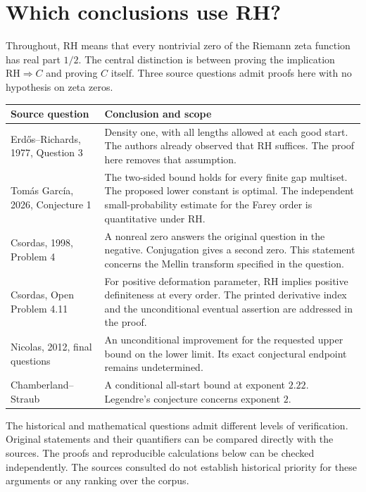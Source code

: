 \documentclass[11pt,a4paper]{article}
\begin{document}
\section{Which conclusions use RH?}
Throughout, RH means that every nontrivial zero of the Riemann zeta function
has real part $1/2$. The central distinction is between proving the
implication $\mathrm{RH}\Rightarrow C$ and proving $C$ itself.
Three source questions admit proofs here with no hypothesis on zeta zeros.
\begin{center}
\small\renewcommand{\arraystretch}{1.24}
\begin{tabularx}{\linewidth}{@{}p{.26\linewidth}X@{}}
\toprule
Source question & Conclusion and scope\\
\midrule
Erd\H{o}s--Richards, 1977, Question 3 \cite{er} &
Density one, with all lengths allowed at each good start. The authors
already observed that RH suffices. The proof here removes that assumption.\\
Tom\'as Garc\'ia, 2026, Conjecture 1 \cite{tg} &
The two-sided bound holds for every finite gap multiset. The proposed
lower constant is optimal. The independent small-probability estimate
for the Farey order is quantitative under RH.\\
Csordas, 1998, Problem 4 \cite{cs98} &
A nonreal zero answers the original question in the negative.
Conjugation gives a second zero. This statement concerns the Mellin
transform specified in the question.\\
Csordas, Open Problem 4.11 \cite{cs15} &
For positive deformation parameter, RH implies positive definiteness
at every order. The printed derivative index and the unconditional
eventual assertion are addressed in the proof.\\
Nicolas, 2012, final questions \cite{nic} &
An unconditional improvement for the requested upper bound on the
lower limit. Its exact conjectural endpoint remains undetermined.\\
Chamberland--Straub \cite{chstr} &
A conditional all-start bound at exponent $2.22$. Legendre's
conjecture concerns exponent $2$.\\
\bottomrule
\end{tabularx}
\end{center}
The historical and mathematical questions admit different levels of
verification. Original statements and their quantifiers can be compared
directly with the sources. The proofs and reproducible calculations
below can be checked independently. The sources consulted do not establish
historical priority for these arguments or any ranking over the corpus.
\end{document}
